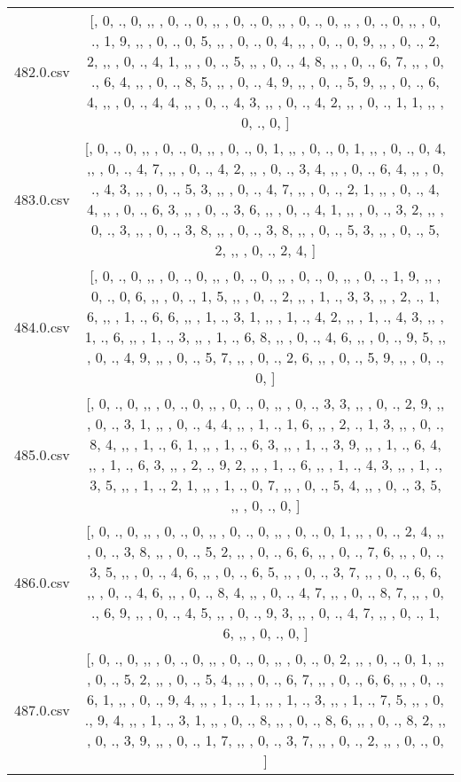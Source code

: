 \begin{table}[ht]
\begin{tabular}{@{}c c@{}}
	482.0.csv & [, 0, ., 0, ,,  , 0, ., 0, ,,  , 0, ., 0, ,,  , 0, ., 0, ,,  , 0, ., 0, ,,  , 0, ., 1, 9, ,,  , 0, ., 0, 5, ,,  , 0, ., 0, 4, ,,  , 0, ., 0, 9, ,,  , 0, ., 2, 2, ,,  , 0, ., 4, 1, ,,  , 0, ., 5, ,,  , 0, ., 4, 8, ,,  , 0, ., 6, 7, ,,  , 0, ., 6, 4, ,,  , 0, ., 8, 5, ,,  , 0, ., 4, 9, ,,  , 0, ., 5, 9, ,,  , 0, ., 6, 4, ,,  , 0, ., 4, 4, ,,  , 0, ., 4, 3, ,,  , 0, ., 4, 2, ,,  , 0, ., 1, 1, ,,  , 0, ., 0, ]\\ 
	483.0.csv & [, 0, ., 0, ,,  , 0, ., 0, ,,  , 0, ., 0, 1, ,,  , 0, ., 0, 1, ,,  , 0, ., 0, 4, ,,  , 0, ., 4, 7, ,,  , 0, ., 4, 2, ,,  , 0, ., 3, 4, ,,  , 0, ., 6, 4, ,,  , 0, ., 4, 3, ,,  , 0, ., 5, 3, ,,  , 0, ., 4, 7, ,,  , 0, ., 2, 1, ,,  , 0, ., 4, 4, ,,  , 0, ., 6, 3, ,,  , 0, ., 3, 6, ,,  , 0, ., 4, 1, ,,  , 0, ., 3, 2, ,,  , 0, ., 3, ,,  , 0, ., 3, 8, ,,  , 0, ., 3, 8, ,,  , 0, ., 5, 3, ,,  , 0, ., 5, 2, ,,  , 0, ., 2, 4, ]\\ 
	484.0.csv & [, 0, ., 0, ,,  , 0, ., 0, ,,  , 0, ., 0, ,,  , 0, ., 0, ,,  , 0, ., 1, 9, ,,  , 0, ., 0, 6, ,,  , 0, ., 1, 5, ,,  , 0, ., 2, ,,  , 1, ., 3, 3, ,,  , 2, ., 1, 6, ,,  , 1, ., 6, 6, ,,  , 1, ., 3, 1, ,,  , 1, ., 4, 2, ,,  , 1, ., 4, 3, ,,  , 1, ., 6, ,,  , 1, ., 3, ,,  , 1, ., 6, 8, ,,  , 0, ., 4, 6, ,,  , 0, ., 9, 5, ,,  , 0, ., 4, 9, ,,  , 0, ., 5, 7, ,,  , 0, ., 2, 6, ,,  , 0, ., 5, 9, ,,  , 0, ., 0, ]\\ 
	485.0.csv & [, 0, ., 0, ,,  , 0, ., 0, ,,  , 0, ., 0, ,,  , 0, ., 3, 3, ,,  , 0, ., 2, 9, ,,  , 0, ., 3, 1, ,,  , 0, ., 4, 4, ,,  , 1, ., 1, 6, ,,  , 2, ., 1, 3, ,,  , 0, ., 8, 4, ,,  , 1, ., 6, 1, ,,  , 1, ., 6, 3, ,,  , 1, ., 3, 9, ,,  , 1, ., 6, 4, ,,  , 1, ., 6, 3, ,,  , 2, ., 9, 2, ,,  , 1, ., 6, ,,  , 1, ., 4, 3, ,,  , 1, ., 3, 5, ,,  , 1, ., 2, 1, ,,  , 1, ., 0, 7, ,,  , 0, ., 5, 4, ,,  , 0, ., 3, 5, ,,  , 0, ., 0, ]\\ 
	486.0.csv & [, 0, ., 0, ,,  , 0, ., 0, ,,  , 0, ., 0, ,,  , 0, ., 0, 1, ,,  , 0, ., 2, 4, ,,  , 0, ., 3, 8, ,,  , 0, ., 5, 2, ,,  , 0, ., 6, 6, ,,  , 0, ., 7, 6, ,,  , 0, ., 3, 5, ,,  , 0, ., 4, 6, ,,  , 0, ., 6, 5, ,,  , 0, ., 3, 7, ,,  , 0, ., 6, 6, ,,  , 0, ., 4, 6, ,,  , 0, ., 8, 4, ,,  , 0, ., 4, 7, ,,  , 0, ., 8, 7, ,,  , 0, ., 6, 9, ,,  , 0, ., 4, 5, ,,  , 0, ., 9, 3, ,,  , 0, ., 4, 7, ,,  , 0, ., 1, 6, ,,  , 0, ., 0, ]\\ 
	487.0.csv & [, 0, ., 0, ,,  , 0, ., 0, ,,  , 0, ., 0, ,,  , 0, ., 0, 2, ,,  , 0, ., 0, 1, ,,  , 0, ., 5, 2, ,,  , 0, ., 5, 4, ,,  , 0, ., 6, 7, ,,  , 0, ., 6, 6, ,,  , 0, ., 6, 1, ,,  , 0, ., 9, 4, ,,  , 1, ., 1, ,,  , 1, ., 3, ,,  , 1, ., 7, 5, ,,  , 0, ., 9, 4, ,,  , 1, ., 3, 1, ,,  , 0, ., 8, ,,  , 0, ., 8, 6, ,,  , 0, ., 8, 2, ,,  , 0, ., 3, 9, ,,  , 0, ., 1, 7, ,,  , 0, ., 3, 7, ,,  , 0, ., 2, ,,  , 0, ., 0, ]\\ 

\end{tabular}
\end{table}
